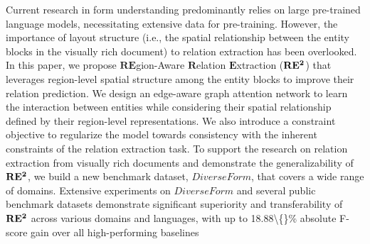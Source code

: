 Current research in form understanding predominantly relies on large pre-trained language models, necessitating extensive data for pre-training. However, the importance of layout structure (i.e., the spatial relationship between the entity blocks in the visually rich document) to relation extraction has been overlooked. In this paper, we propose $\textbf{RE}$gion-Aware $\textbf{R}$elation $\textbf{E}$xtraction ($\bf{RE^2}$) that leverages region-level spatial structure among the entity blocks to improve their relation prediction. We design an edge-aware graph attention network to learn the interaction between entities while considering their spatial relationship defined by their region-level representations. We also introduce a constraint objective to regularize the model towards consistency with the inherent constraints of the relation extraction task. To support the research on relation extraction from visually rich documents and demonstrate the generalizability of $\bf{RE^2}$, we build a new benchmark dataset, ${DiverseForm}$, that covers a wide range of domains. Extensive experiments on ${DiverseForm}$ and several public benchmark datasets demonstrate significant superiority and transferability of $\bf{RE^2}$ across various domains and languages, with up to 18.88\textbackslash\{\}\% absolute F-score gain over all high-performing baselines